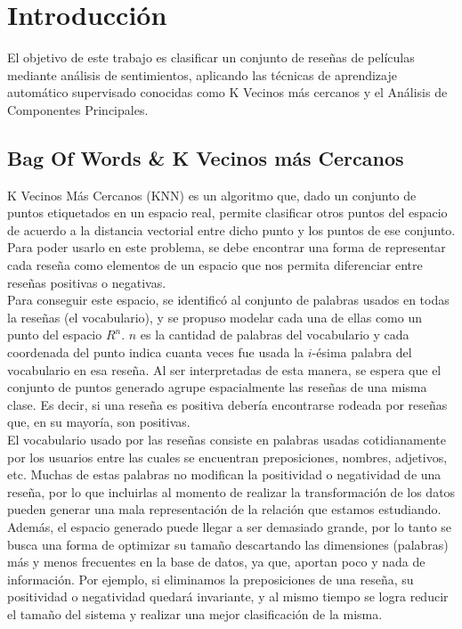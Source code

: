 \section{Introducción}\label{sec::intro}
El objetivo de este trabajo es clasificar un conjunto de reseñas de películas mediante análisis de sentimientos, aplicando las técnicas de aprendizaje automático supervisado conocidas como K Vecinos más cercanos y el Análisis de Componentes Principales.

\subsection*{Bag Of Words \& K Vecinos más Cercanos}

K Vecinos Más Cercanos (KNN) es un algoritmo que, dado un conjunto de puntos etiquetados en un espacio real,  permite clasificar otros puntos del espacio de acuerdo a la distancia vectorial entre dicho punto y los puntos de ese conjunto. Para poder usarlo en este problema, se debe encontrar una forma de representar cada reseña como elementos de un espacio que nos permita diferenciar entre reseñas positivas o negativas.\\

Para conseguir este espacio, se identificó al conjunto de palabras usados en todas la reseñas (el vocabulario), y se propuso modelar cada una de ellas como un punto del espacio $R^n$. $n$ es la cantidad de palabras del vocabulario y cada coordenada del punto indica cuanta veces fue usada la $i$-ésima palabra del vocabulario en esa reseña. Al ser interpretadas de esta manera, se espera que el conjunto de puntos generado agrupe espacialmente las reseñas de una misma clase. Es decir, si una reseña es positiva debería encontrarse rodeada por reseñas que, en su mayoría, son positivas.\\

El vocabulario usado por las reseñas consiste en palabras usadas cotidianamente por los usuarios entre las cuales se encuentran preposiciones, nombres, adjetivos, etc. Muchas de estas palabras no modifican la positividad o negatividad de una reseña, por lo que incluirlas al momento de realizar la transformación de los datos pueden generar una mala representación de la relación que estamos estudiando. Además, el espacio generado puede llegar a ser demasiado grande, por lo tanto se busca una forma de optimizar su tamaño descartando las dimensiones (palabras) más y menos frecuentes en la base de datos, ya que, aportan poco y nada de información. Por ejemplo, si eliminamos la preposiciones de una reseña, su positividad o negatividad quedará invariante, y al mismo tiempo se logra reducir el tamaño del sistema y realizar una mejor clasificación de la misma.\\ 

